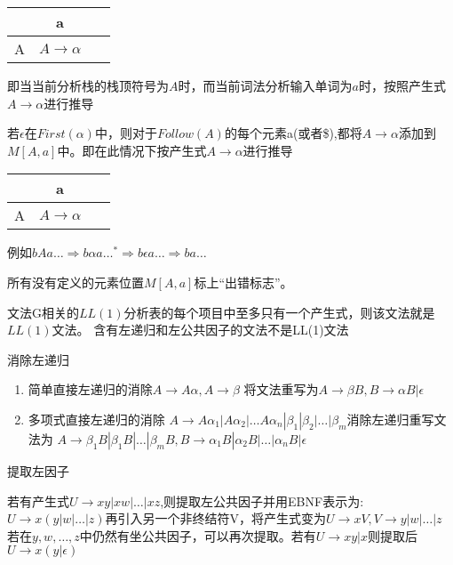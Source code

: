 \documentclass[utf8]{ctexart}
\begin{document}
\begin{center}
\begin{tabular}{|c|c|c|}
    \hline 
    \  & a & \  \\
    \hline 
    A & $A \rightarrow \alpha$ & \ \\ 
    \hline
\end{tabular}
\end{center}

即当当前分析栈的栈顶符号为$A$时，而当前词法分析输入单词为$a$时，按照产生式$A \rightarrow \alpha$进行推导

若$\epsilon$在$First(\alpha)$中，则对于$Follow(A)$的每个元素a(或者\$),都将$A \rightarrow \alpha$添加到$M[A,a]$中。即在此情况下按产生式$A \rightarrow \alpha$进行推导

\begin{center}
    \begin{tabular}{|c|c|c|}
        \hline 
        \  & a & \  \\
        \hline 
        A & $A \rightarrow \alpha$ & \ \\ 
        \hline
\end{tabular}
\end{center}

例如$bAa\dots \Rightarrow b\alpha a\dots ^* \Rightarrow b\epsilon a\dots \Rightarrow ba\dots$

所有没有定义的元素位置$M[A,a]$标上“出错标志”。

文法G相关的$LL(1)$分析表的每个项目中至多只有一个产生式，则该文法就是$LL(1)$文法。
含有左递归和左公共因子的文法不是LL(1)文法

\noindent 消除左递归
\begin{enumerate}
    \item 简单直接左递归的消除$A \rightarrow A\alpha, A \rightarrow \beta$ 将文法重写为$A \rightarrow \beta B, B \rightarrow \alpha B| \epsilon$
    \item 多项式直接左递归的消除 $A \rightarrow A{\alpha}_1|A{\alpha}_2| \dots A{\alpha}_n|{\beta}_1|{\beta}_2| \dots |{\beta}_m$消除左递归重写文法为
          $A \rightarrow {\beta}_1B|{\beta}_1B|\dots|{\beta}_mB, B \rightarrow {\alpha}_1B|{\alpha}_2B|\dots|{\alpha}_nB|\epsilon$
\end{enumerate}

\noindent 提取左因子

若有产生式$U \rightarrow xy|xw|\dots|xz$,则提取左公共因子并用EBNF表示为:$U \rightarrow x(y|w|\dots|z)$再引入另一个非终结符V，将产生式变为$U \rightarrow xV, V \rightarrow y|w|\dots|z$
若在$y,w,\dots,z$中仍然有坐公共因子，可以再次提取。若有$U \rightarrow xy|x$则提取后$U \rightarrow x(y|\epsilon)$
\end{document}
